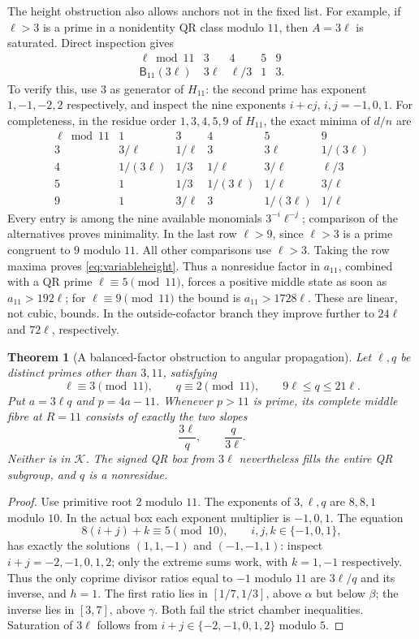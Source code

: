 \documentclass[11pt]{article}
\newtheorem{theorem}{Theorem}[section]
\theoremstyle{definition}\newtheorem{definition}[theorem]{Definition}
\theoremstyle{remark}\newtheorem{remark}[theorem]{Remark}
\newcommand{\K}{\mathcal K}
\newcommand{\B}{\mathsf B}
\begin{document}
The height obstruction also allows anchors not in the fixed list. For example, if $\ell>3$ is a prime in a nonidentity QR class modulo $11$, then $A=3\ell$ is saturated. Direct inspection gives
\begin{equation}\label{eq:variableheight}
\begin{array}{c|rrrr}
 \ell\bmod11&3&4&5&9\\\hline
 \B_{11}(3\ell)&3\ell&\ell/3&1&3.
\end{array}
\end{equation}
To verify this, use $3$ as generator of $H_{11}$: the second prime has exponent $1,-1,-2,2$ respectively, and inspect the nine exponents $i+cj$, $i,j=-1,0,1$. For completeness, in the residue order $1,3,4,5,9$ of $H_{11}$, the exact minima of $d/n$ are
\[
\begin{array}{c|ccccc}
\ell\bmod11&1&3&4&5&9\\\hline
3&3/\ell&1/\ell&3&3\ell&1/(3\ell)\\
4&1/(3\ell)&1/3&1/\ell&3/\ell&\ell/3\\
5&1&1/3&1/(3\ell)&1/\ell&3/\ell\\
9&1&3/\ell&3&1/(3\ell)&1/\ell
\end{array}
\]
Every entry is among the nine available monomials $3^{-i}\ell^{-j}$; comparison of the alternatives proves minimality. In the last row $\ell>9$, since $\ell>3$ is a prime congruent to $9$ modulo $11$. All other comparisons use $\ell>3$. Taking the row maxima proves \eqref{eq:variableheight}. Thus a nonresidue factor in $a_{11}$, combined with a QR prime $\ell\equiv5\pmod{11}$, forces a positive middle state as soon as $a_{11}>192\ell$; for $\ell\equiv9\pmod{11}$ the bound is $a_{11}>1728\ell$. These are linear, not cubic, bounds. In the outside-cofactor branch they improve further to $24\ell$ and $72\ell$, respectively.

\begin{theorem}[A balanced-factor obstruction to angular propagation]\label{thm:barrier}
Let $\ell,q$ be distinct primes other than $3,11$, satisfying
\[
 \ell\equiv3\pmod{11},\qquad q\equiv2\pmod{11},
 \qquad9\ell\le q\le21\ell.
\]
Put $a=3\ell q$ and $p=4a-11$. Whenever $p>11$ is prime, its complete middle fibre at $R=11$ consists of exactly the two slopes
\[
 \frac{3\ell}{q},\qquad\frac q{3\ell}.
\]
Neither is in $\K$. The signed QR box from $3\ell$ nevertheless fills the entire QR subgroup, and $q$ is a nonresidue.
\end{theorem}
\begin{proof}
Use primitive root $2$ modulo $11$. The exponents of $3,\ell,q$ are $8,8,1$ modulo $10$. In the actual box each exponent multiplier is $-1,0,1$. The equation
\[
 8(i+j)+k\equiv5\pmod{10},\qquad i,j,k\in\{-1,0,1\},
\]
has exactly the solutions $(1,1,-1)$ and $(-1,-1,1)$: inspect $i+j=-2,-1,0,1,2$; only the extreme sums work, with $k=1,-1$ respectively. Thus the only coprime divisor ratios equal to $-1$ modulo $11$ are $3\ell/q$ and its inverse, and $h=1$.
The first ratio lies in $[1/7,1/3]$, above $\alpha$ but below $\beta$; the inverse lies in $[3,7]$, above $\gamma$. Both fail the strict chamber inequalities. Saturation of $3\ell$ follows from $i+j\in\{-2,-1,0,1,2\}$ modulo $5$.
\end{proof}
\end{document}
